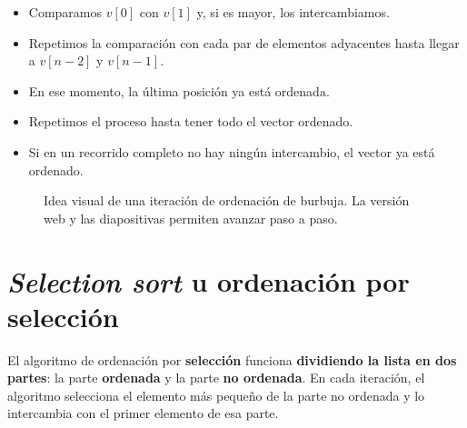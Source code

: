 \documentclass[
  spanish,
  11pt,
  a4paper,
  DIV=11,
  numbers=noendperiod]{scrartcl}
\providecommand{\tightlist}{\setlength{\itemsep}{0pt}\setlength{\parskip}{0pt}}
\begin{document}
\begin{itemize}
\tightlist
\item Comparamos \(v[0]\) con \(v[1]\) y, si es mayor, los intercambiamos.
\item Repetimos la comparación con cada par de elementos adyacentes hasta llegar a \(v[n-2]\) y \(v[n-1]\).
\item En ese momento, la última posición ya está ordenada.
\item Repetimos el proceso hasta tener todo el vector ordenado.
\item Si en un recorrido completo no hay ningún intercambio, el vector ya está ordenado.
\end{itemize}

\begin{figure}[H]
\centering
{}
\caption{Idea visual de una iteración de ordenación de burbuja. La versión web y las diapositivas permiten avanzar paso a paso.}\label{fig-burbuja-estatica}
\end{figure}

\section{\texorpdfstring{\emph{Selection sort} u ordenación por selección}{Selection sort u ordenación por selección}}\label{selection-sort-u-ordenacion-por-seleccion}

El algoritmo de ordenación por \textbf{selección} funciona \textbf{dividiendo la lista en dos partes}: la parte \textbf{ordenada} y la parte \textbf{no ordenada}. En cada iteración, el algoritmo selecciona el elemento más pequeño de la parte no ordenada y lo intercambia con el primer elemento de esa parte.
\end{document}
